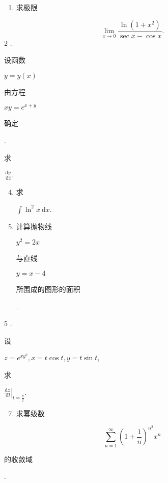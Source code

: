 \documentclass[10pt]{article}
\begin{document}
\begin{enumerate}
  \item \begin{CJK}{UTF8}{mj}求极限\end{CJK}
\end{enumerate}
$$
\lim _{x \rightarrow 0} \frac{\ln \left(1+x^{2}\right)}{\sec x-\cos x} .
$$
2 . \begin{CJK}{UTF8}{mj}设函数\end{CJK} $y=y(x)$ \begin{CJK}{UTF8}{mj}由方程\end{CJK} $x y=e^{x+y}$ \begin{CJK}{UTF8}{mj}确定\end{CJK}. \begin{CJK}{UTF8}{mj}求\end{CJK} $\frac{\mathrm{d} y}{\mathrm{~d} x}$.

\begin{enumerate}
  \setcounter{enumi}{3}
  \item \begin{CJK}{UTF8}{mj}求\end{CJK} $\int \ln ^{2} x \mathrm{~d} x$.

  \item \begin{CJK}{UTF8}{mj}计算抛物线\end{CJK} $y^{2}=2 x$ \begin{CJK}{UTF8}{mj}与直线\end{CJK} $y=x-4$ \begin{CJK}{UTF8}{mj}所围成的图形的面积\end{CJK}.

\end{enumerate}
5 . \begin{CJK}{UTF8}{mj}设\end{CJK} $z=e^{x y^{2}}, x=t \cos t, y=t \sin t$, \begin{CJK}{UTF8}{mj}求\end{CJK} $\left.\frac{\mathrm{d} z}{\mathrm{~d} t}\right|_{t=\frac{\pi}{2}}$.

\begin{enumerate}
  \setcounter{enumi}{6}
  \item \begin{CJK}{UTF8}{mj}求幂级数\end{CJK}
\end{enumerate}
$$
\sum_{n=1}^{\infty}\left(1+\frac{1}{n}\right)^{n^{2}} x^{n}
$$
\begin{CJK}{UTF8}{mj}的收敛域\end{CJK}.
\end{document}
